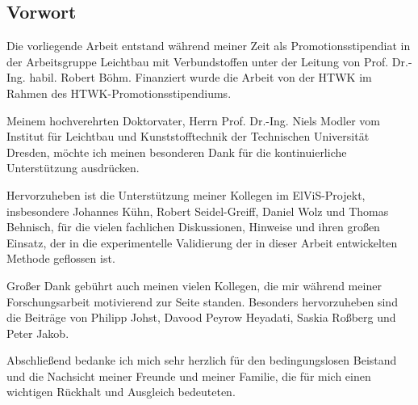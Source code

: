 \hypersetup{pageanchor=false}
\thispagestyle{empty}
\cleardoublepage

\thispagestyle{empty}

\vspace*{\fill}\vspace*{\fill}\vspace*{\fill}\vspace*{\fill}\vspace*{\fill}

\subsection*{Vorwort}

Die vorliegende Arbeit entstand während meiner Zeit als Promotionsstipendiat in der Arbeitsgruppe Leichtbau mit Verbundstoffen unter der Leitung von Prof. Dr.-Ing. habil. Robert Böhm. Finanziert wurde die Arbeit von der HTWK im Rahmen des HTWK-Promotionsstipendiums.

Meinem hochverehrten Doktorvater, Herrn Prof. Dr.-Ing. Niels Modler vom Institut für Leichtbau und Kunststofftechnik der Technischen Universität Dresden, möchte ich meinen besonderen Dank für die kontinuierliche Unterstützung ausdrücken.

Hervorzuheben ist die Unterstützung meiner Kollegen im ElViS-Projekt, insbesondere Johannes Kühn, Robert Seidel-Greiff, Daniel Wolz und Thomas Behnisch, für die vielen fachlichen Diskussionen, Hinweise und ihren großen Einsatz, der in die experimentelle Validierung der in dieser Arbeit entwickelten Methode geflossen ist.

Großer Dank gebührt auch meinen vielen Kollegen, die mir während meiner Forschungsarbeit motivierend zur Seite standen. Besonders hervorzuheben sind die Beiträge von Philipp Johst, Davood Peyrow Heyadati, Saskia Roßberg und Peter Jakob.

Abschließend bedanke ich mich sehr herzlich für den bedingungslosen Beistand und die Nachsicht meiner Freunde und meiner Familie, die für mich einen wichtigen Rückhalt und Ausgleich bedeuteten.

\cleardoublepage
\hypersetup{pageanchor=true}